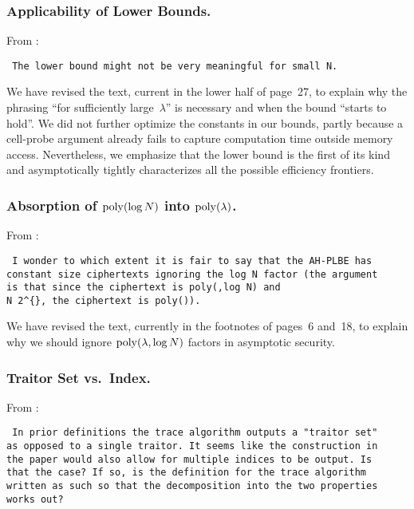 \subsubsection{Applicability of Lower Bounds.}
From :

\texttt{
The lower bound might not be very meaningful for small N.
}

We have revised the text, current in the lower half of page~27,
to explain why the phrasing ``for sufficiently large~$\lambda$'' is necessary
and when the bound ``starts to hold''.
We did not further optimize the constants in our bounds,
partly because a cell-probe argument
already fails to capture computation time outside memory access.
Nevertheless, we emphasize that the lower bound is the first of its kind
and asymptotically tightly characterizes all the possible efficiency frontiers.

\subsubsection{Absorption of $\operatorname{poly}(\log N)$ into $\operatorname{poly}(\lambda)$.}
From :

\texttt{
I wonder to which extent it is fair to say that the AH-PLBE has \\
constant size ciphertexts ignoring the log N factor (the argument \\
is that since the ciphertext is poly({\string\lambda},log N) and \\
N {\string\leq} 2\string^\{{\string\lambda}\}, the ciphertext is poly({\string\lambda})).
}

We have revised the text,
currently in the footnotes of pages~6 and~18,
to explain why we should ignore $\operatorname{poly}(\lambda,\log N)$ factors
in asymptotic security.

\subsubsection{Traitor Set vs.\ Index.}
From :

\texttt{
In prior definitions the trace algorithm outputs a "traitor set" \\
as opposed to a single traitor. It seems like the construction in \\
the paper would also allow for multiple indices to be output. Is \\
that the case? If so, is the definition for the trace algorithm \\
written as such so that the decomposition into the two properties \\
works out?
}

